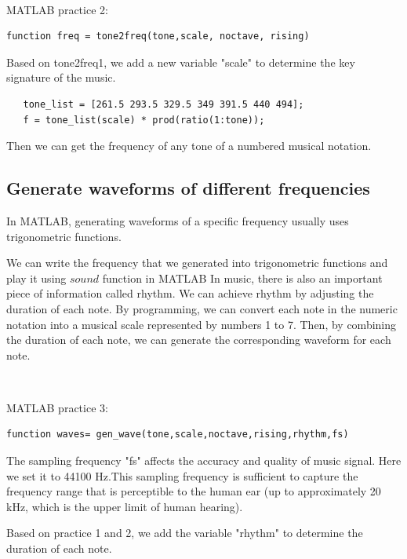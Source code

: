 \documentclass[journal]{IEEEtran}
\begin{document}
$~$

\textcolor[rgb]{0,0.6,1}{MATLAB practice 2:}


\begin{lstlisting}[style=Matlab-editor]
   function freq = tone2freq(tone,scale, noctave, rising)
\end{lstlisting}


Based on tone2freq1, we add a new variable "scale" to determine the key signature of the music.
\begin{lstlisting}[style=Matlab-editor]
   % Define the base frequencies for each scale
   tone_list = [261.5 293.5 329.5 349 391.5 440 494];
   f = tone_list(scale) * prod(ratio(1:tone));
\end{lstlisting}

Then we can get the frequency of any tone of a numbered musical notation.
\subsection{Generate waveforms of different frequencies}



In MATLAB, generating waveforms of a specific frequency usually uses trigonometric functions.

We can write the frequency that we generated into trigonometric functions and play it using $sound$ function in MATLAB In music, there is also an important piece of information called \textcolor[rgb]{0,0.6,1}{rhythm}. We can achieve rhythm by adjusting the duration of each note. By programming, we can convert each note in the numeric notation into a musical scale represented by numbers 1 to 7. Then, by combining the duration of each note, we can generate the corresponding waveform for each note.

$~$

\textcolor[rgb]{0,0.6,1}{MATLAB practice 3:}

\begin{lstlisting}[style=Matlab-editor]
   function waves= gen_wave(tone,scale,noctave,rising,rhythm,fs)
\end{lstlisting}

The sampling frequency "fs" affects the accuracy and quality of music signal. Here we set it to 44100 Hz.This sampling frequency is sufficient to capture the frequency range that is perceptible to the human ear (up to approximately 20 kHz, which is the upper limit of human hearing).

Based on practice 1 and 2, we add the variable "rhythm" to determine the duration of each note.
\end{document}
